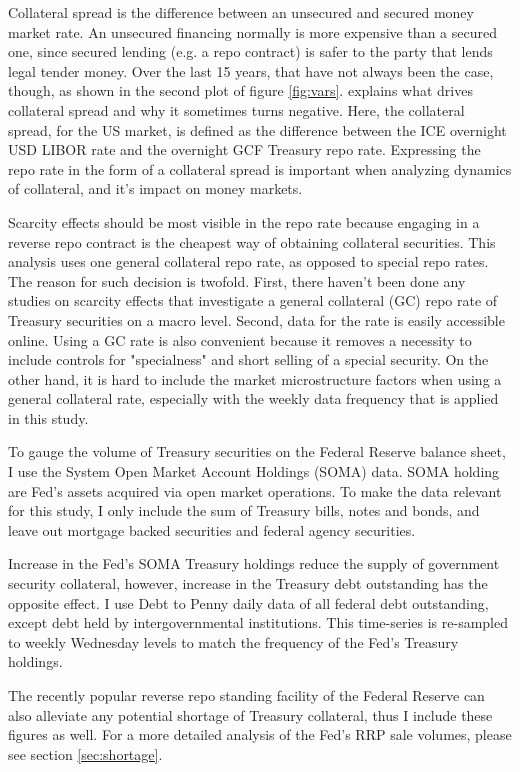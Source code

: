 \documentclass[11pt,a4paper,english,oneside]{article}
\begin{document}
Collateral spread is the difference between an unsecured and secured money market rate. An unsecured financing normally is more expensive than a secured one, since secured lending (e.g. a repo contract) is safer to the party that lends legal tender money. Over the last 15 years, that have not always been the case, though, as shown in the second plot of figure \ref{fig:vars}. \citet{nyborg2019a} explains what drives collateral spread and why it sometimes turns negative. Here, the collateral spread, for the US market, is defined as the difference between the ICE overnight USD LIBOR rate and the overnight GCF Treasury repo rate. Expressing the repo rate in the form of a collateral spread is important when analyzing dynamics of collateral, and it's impact on money markets.

Scarcity effects should be most visible in the repo rate because engaging in a reverse repo contract is the cheapest way of obtaining collateral securities. This analysis uses one general collateral repo rate, as opposed to special repo rates. The reason for such decision is twofold. First, there haven't been done any studies on scarcity effects that investigate a general collateral (GC) repo rate of Treasury securities on a macro level. Second, data for the rate is easily accessible online. Using a GC rate is also convenient because it removes a necessity to include controls for "specialness" and short selling of a special security. On the other hand, it is hard to include the market microstructure factors when using a general collateral rate, especially with the weekly data frequency that is applied in this study.

To gauge the volume of Treasury securities on the Federal Reserve balance sheet, I use the System Open Market Account Holdings (SOMA) data. SOMA holding are Fed's assets acquired via open market operations. To make the data relevant for this study, I only include the sum of Treasury bills, notes and bonds, and leave out mortgage backed securities and federal agency securities.

Increase in the Fed's SOMA Treasury holdings reduce the supply of government security collateral, however, increase in the Treasury debt outstanding has the opposite effect. I use Debt to Penny daily data of all federal debt outstanding, except debt held by intergovernmental institutions. This time-series is re-sampled to weekly Wednesday levels to match the frequency of the Fed's Treasury holdings.

The recently popular reverse repo standing facility of the Federal Reserve can also alleviate any potential shortage of Treasury collateral, thus I include these figures as well. For a more detailed analysis of the Fed's RRP sale volumes, please see section \ref{sec:shortage}.
\end{document}
